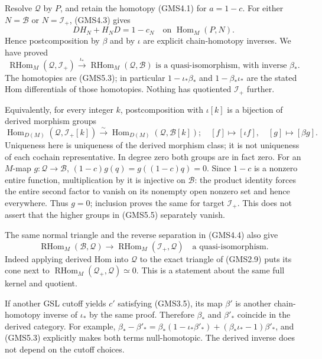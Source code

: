 Resolve \(\mathcal Q\) by \(P\), and retain the homotopy (GMS4.1) for
\(a=1-c\). For either \(N=\mathcal B\) or \(N=\mathcal I_+\), (GMS4.3)
gives \[
DH_N+H_ND=1-c_N
\quad\text{on }\operatorname{Hom}_M(P,N).
\tag{GMS5.3}
\] Hence postcomposition by \(\beta\) and by \(\iota\) are explicit
chain-homotopy inverses. We have proved \[
\boxed{
\operatorname{RHom}_M(\mathcal Q,\mathcal I_+)
\xrightarrow{\ \iota_*\ }
\operatorname{RHom}_M(\mathcal Q,\mathcal B)
\text{ is a quasi-isomorphism, with inverse }\beta_*.
}
\tag{GMS5.4}
\] The homotopies are (GMS5.3); in particular \(1-\iota_*\beta_*\) and
\(1-\beta_*\iota_*\) are the stated Hom differentials of those
homotopies. Nothing has quotiented \(\mathcal I_+\) further.

Equivalently, for every integer \(k\), postcomposition with \(\iota[k]\)
is a bijection of derived morphism groups \[
\operatorname{Hom}_{D(M)}(\mathcal Q,\mathcal I_+[k])
\xrightarrow{\sim}
\operatorname{Hom}_{D(M)}(\mathcal Q,\mathcal B[k]);
\quad [f]\longmapsto[\iota f],\quad
[g]\longmapsto[\beta g].
\tag{GMS5.5}
\] Uniqueness here is uniqueness of the derived morphism class; it is
not uniqueness of each cochain representative. In degree zero both
groups are in fact zero. For an \(M\)-map \(g:\mathcal Q\to\mathcal B\),
\((1-c)g(q)=g((1-c)q)=0\). Since \(1-c\) is a nonzero entire function,
multiplication by it is injective on \(\mathcal B\): the product
identity forces the entire second factor to vanish on its nonempty open
nonzero set and hence everywhere. Thus \(g=0\); inclusion proves the
same for target \(\mathcal I_+\). This does not assert that the higher
groups in (GMS5.5) separately vanish.

The same normal triangle and the reverse separation in (GMS4.4) also
give \[
\operatorname{RHom}_M(\mathcal B,\mathcal Q)
\longrightarrow\operatorname{RHom}_M(\mathcal I_+,\mathcal Q)
\quad\text{a quasi-isomorphism}.
\tag{GMS5.6}
\] Indeed applying derived Hom into \(\mathcal Q\) to the exact triangle
of (GMS2.9) puts its cone next to
\(\operatorname{RHom}_M(\mathcal Q_+,\mathcal Q)\simeq0\). This is a
statement about the same full kernel and quotient.

If another GSL cutoff yields \(c'\) satisfying (GMS3.5), its map
\(\beta'\) is another chain-homotopy inverse of \(\iota_*\) by the same
proof. Therefore \(\beta_*\) and \(\beta'_*\) coincide in the derived
category. For example,
\(\beta_* -\beta'_* =\beta_*(1-\iota_*\beta'_*)+(\beta_*\iota_*-1)\beta'_*\),
and (GMS5.3) explicitly makes both terms null-homotopic. The derived
inverse does not depend on the cutoff choices.

